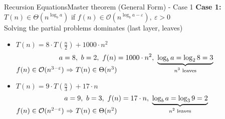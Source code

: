 \begin{frame}{Recursion Equations}{Master theorem (General Form) - Case 1}
  \textbf{Case 1:}
  {\color{Mittel-Gruen}$T(n) \in \Theta(n^{\log_b a})$}
  \hfill if {\color{Mittel-Blau}
    $f(n) \in \mathcal{O}(n^{\log_b a-\varepsilon}), ~ \varepsilon > 0$
   }\\
   {\color{gray}Solving the partial problems dominates (last layer, leaves)}
   \vspace{1.0em}
   \begin{itemize}
     \item
       $T(n) = 8 \cdot T(\tfrac{n}{2}) + 1000 \cdot n^2$
       \vspace{-0.5em}
       \begin{displaymath}
         a = 8, ~ b = 2, ~ f(n) = 1000 \cdot n^2, ~
         \smash{\underbrace{
           \log_b a = \log_2 8 = 3
         }_{\text{$n^3$ leaves}}}
       \end{displaymath}
       {\color{Mittel-Blau}\begin{math}
          f(n) \in \mathcal{O}(n^{3-\varepsilon})$
          $\Rightarrow$
          $T(n) \in \Theta(n^3)
       \end{math}}
      \vspace{1.5em}
    \item
      $T(n) = 9 \cdot T(\tfrac{n}{3}) + 17 \cdot n$
      \vspace{-0.5em}
      \begin{displaymath}
        a = 9, ~ b = 3, ~ f(n) = 17 \cdot n, ~
        \smash{\underbrace{
          \log_b a = \log_3 9 = 2
        }_{\text{$n^2$ leaves}}}
      \end{displaymath}
      {\color{Mittel-Blau}\begin{math}
        f(n) \in \mathcal{O}(n^{2-\varepsilon})$
        $\Rightarrow$
        $T(n) \in \Theta(n^2)
      \end{math}}
   \end{itemize}
\end{frame}


